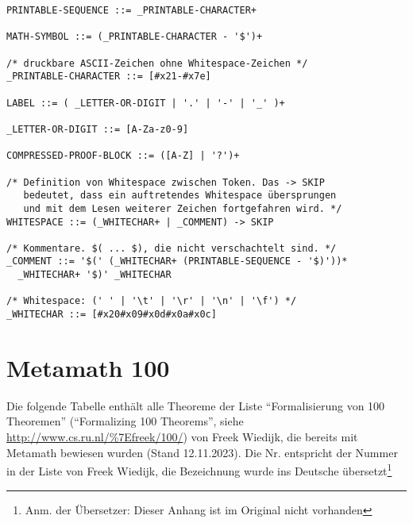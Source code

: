 \begin{verbatim}
PRINTABLE-SEQUENCE ::= _PRINTABLE-CHARACTER+

MATH-SYMBOL ::= (_PRINTABLE-CHARACTER - '$')+

/* druckbare ASCII-Zeichen ohne Whitespace-Zeichen */
_PRINTABLE-CHARACTER ::= [#x21-#x7e]

LABEL ::= ( _LETTER-OR-DIGIT | '.' | '-' | '_' )+

_LETTER-OR-DIGIT ::= [A-Za-z0-9]

COMPRESSED-PROOF-BLOCK ::= ([A-Z] | '?')+

/* Definition von Whitespace zwischen Token. Das -> SKIP
   bedeutet, dass ein auftretendes Whitespace übersprungen
   und mit dem Lesen weiterer Zeichen fortgefahren wird. */
WHITESPACE ::= (_WHITECHAR+ | _COMMENT) -> SKIP

/* Kommentare. $( ... $), die nicht verschachtelt sind. */
_COMMENT ::= '$(' (_WHITECHAR+ (PRINTABLE-SEQUENCE - '$)'))*
  _WHITECHAR+ '$)' _WHITECHAR

/* Whitespace: (' ' | '\t' | '\r' | '\n' | '\f') */
_WHITECHAR ::= [#x20#x09#x0d#x0a#x0c]
\end{verbatim}
%

\chapter{Metamath 100}%
\label{Metamath100}%

Die folgende Tabelle enthält alle Theoreme der Liste 
"`Formalisierung von 100 Theoremen"' ("`Formalizing 100 Theorems"', siehe \url{http://www.cs.ru.nl/\%7Efreek/100/}) von Freek Wiedijk, die bereits mit Metamath bewiesen wurden (Stand 12.11.2023). Die Nr. entspricht der Nummer in der Liste von Freek Wiedijk, die Bezeichnung wurde ins Deutsche übersetzt\footnote{Anm. der Übersetzer: Dieser Anhang ist im Original nicht vorhanden}

